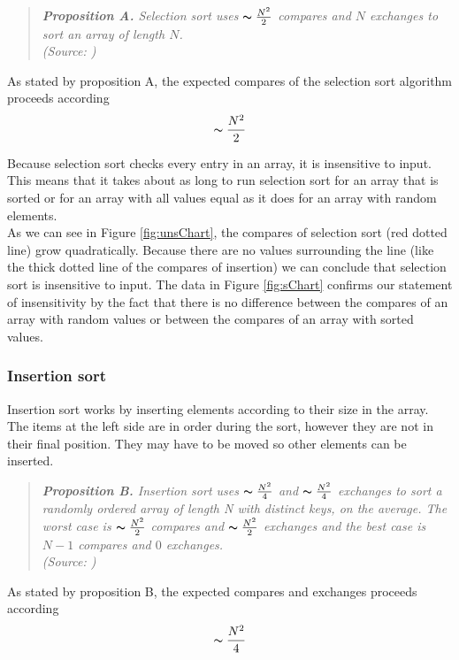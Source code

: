 \documentclass[pdftex,11pt,a4paper,english,titlepage]{article}
\begin{document}
\begin{quote}
\em \noindent \textbf{Proposition A.} Selection sort uses $\thicksim\frac{N^2}{2}$ compares and $N$ exchanges to sort an array of length $N$.\\
\tiny (Source: \citep{Sedgewick2011})
\end{quote}
As stated by proposition A, the expected compares of the selection sort algorithm proceeds according $$\thicksim\frac{N^2}{2}$$

Because selection sort checks every entry in an array, it is insensitive to input. This means that it takes about as long to run selection sort for an array that is sorted or for an array with all values equal as it does for an array with random elements.\\

As we can see in Figure \ref{fig:unsChart}, the compares of selection sort (red dotted line) grow quadratically. Because there are no values surrounding the line (like the thick dotted line of the compares of insertion) we can conclude that selection sort is insensitive to input. The data in Figure \ref{fig:sChart} confirms our statement of insensitivity by the fact that there is no difference between the compares of an array with random values or between the compares of an array with sorted values.

		\subsubsection{Insertion sort}\label{sec:insertion}
Insertion sort works by inserting elements according to their size in the array. The items at the left side are in order during the sort, however they are not in their final position. They may have to be moved so other elements can be inserted.

\begin{quote}
\em \noindent \textbf{Proposition B.} Insertion sort uses $\thicksim\frac{N^2}{4}$ and $\thicksim\frac{N^2}{4}$ exchanges to sort a randomly ordered array of length N with distinct keys, on the average. The worst case is $\thicksim\frac{N^2}{2}$ compares and $\thicksim\frac{N^2}{2}$ exchanges and the best case is $N-1$ compares and $0$ exchanges.\\
\tiny (Source: \cite{Sedgewick2011})
\end{quote}

As stated by proposition B, the expected compares and exchanges proceeds according $$\thicksim\frac{N^2}{4}$$
\end{document}
